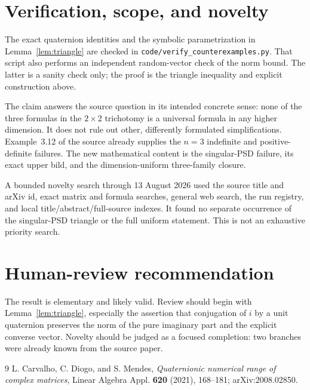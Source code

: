 \documentclass[11pt]{article}
\begin{document}
\section{Verification, scope, and novelty}

The exact quaternion identities and the symbolic parametrization in
Lemma~\ref{lem:triangle} are checked in
\texttt{code/verify\_counterexamples.py}.  That script also performs an
independent random-vector check of the norm bound.  The latter is a sanity
check only; the proof is the triangle inequality and explicit construction
above.

The claim answers the source question in its intended concrete sense: none of
the three formulas in the $2\times2$ trichotomy is a universal formula in any
higher dimension.  It does not rule out other, differently formulated
simplifications.  Example~3.12 of the source already supplies the $n=3$
indefinite and positive-definite failures.  The new mathematical content is
the singular-PSD failure, its exact upper bild, and the dimension-uniform
three-family closure.

A bounded novelty search through 13 August 2026 used the source title and
arXiv id, exact matrix and formula searches, general web search, the run
registry, and local title/abstract/full-source indexes.  It found no separate
occurrence of the singular-PSD triangle or the full uniform statement.  This
is not an exhaustive priority search.

\section{Human-review recommendation}

The result is elementary and likely valid.  Review should begin with
Lemma~\ref{lem:triangle}, especially the assertion that conjugation of $i$ by
a unit quaternion preserves the norm of the pure imaginary part and the
explicit converse vector.  Novelty should be judged as a focused completion:
two branches were already known from the source paper.

\begin{thebibliography}{9}
L. Carvalho, C. Diogo, and S. Mendes,
\emph{Quaternionic numerical range of complex matrices},
Linear Algebra Appl. \textbf{620} (2021), 168--181;
arXiv:2008.02850.
\end{thebibliography}
\end{document}
